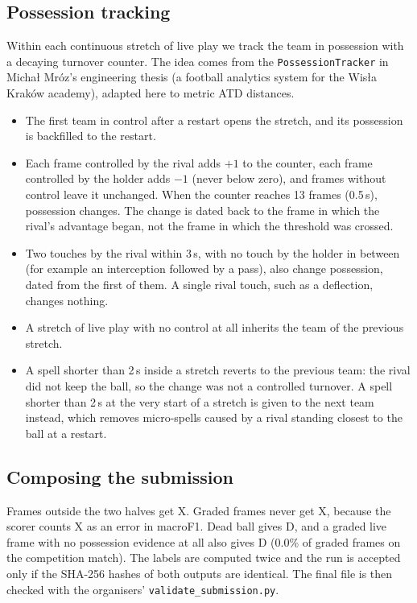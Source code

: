 \documentclass[11pt,a4paper]{article}
\newcommand{\code}[1]{\texttt{#1}}
\begin{document}
\subsection{Possession tracking}
Within each continuous stretch of live play we track the team in possession with a decaying turnover counter. The idea
comes from the \code{PossessionTracker} in Michał Mróz's engineering thesis (a football analytics system for the
Wisła Kraków academy), adapted here to metric ATD distances.
\begin{itemize}
  \item The first team in control after a restart opens the stretch, and its possession is backfilled to the restart.
  \item Each frame controlled by the rival adds $+1$ to the counter, each frame controlled by the holder adds $-1$
    (never below zero), and frames without control leave it unchanged. When the counter reaches 13 frames (0.5\,s),
    possession changes. The change is dated back to the frame in which the rival's advantage began, not the frame in
    which the threshold was crossed.
  \item Two touches by the rival within 3\,s, with no touch by the holder in between (for example an interception
    followed by a pass), also change possession, dated from the first of them. A single rival touch, such as a
    deflection, changes nothing.
  \item A stretch of live play with no control at all inherits the team of the previous stretch.
  \item A spell shorter than 2\,s inside a stretch reverts to the previous team: the rival did not keep the ball, so
    the change was not a controlled turnover. A spell shorter than 2\,s at the very start of a stretch is given to the
    next team instead, which removes micro-spells caused by a rival standing closest to the ball at a restart.
\end{itemize}

\subsection{Composing the submission}
Frames outside the two halves get X. Graded frames never get X, because the scorer counts X as an error in macroF1.
Dead ball gives D, and a graded live frame with no possession evidence at all also gives D (0.0\% of graded frames on
the competition match). The labels are computed twice and the run is accepted only if the SHA-256 hashes of both
outputs are identical. The final file is then checked with the organisers' \code{validate\_submission.py}.
\end{document}
